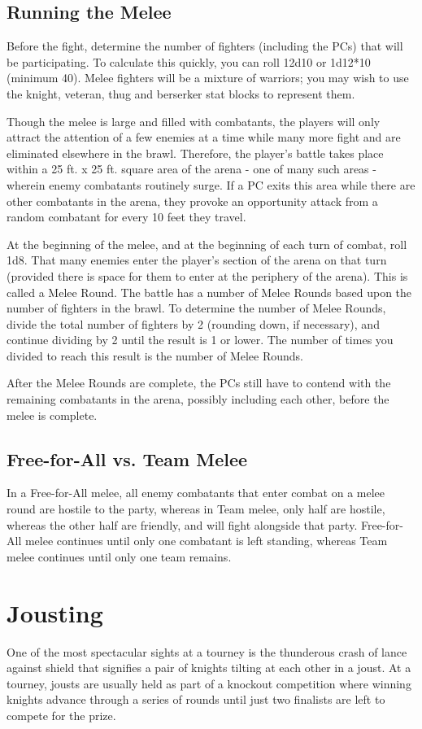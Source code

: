 \documentclass[10pt,a4paper,twoside,bg=print,twocolumn,openany,nodeprecatedcode]{dndbook}
\begin{document}
\subsection{Running the Melee}
Before the fight, determine the number of fighters (including the PCs) that will be participating. To calculate this quickly, you can roll 12d10 or 1d12*10 (minimum 40). Melee fighters will be a mixture of warriors; you may wish to use the knight, veteran, thug and berserker stat blocks to represent them.

Though the melee is large and filled with combatants, the players will only attract the attention of a few enemies at a time while many more fight and are eliminated elsewhere in the brawl. Therefore, the player's battle takes place within a 25 ft. x 25 ft. square area of the arena - one of many such areas - wherein enemy combatants routinely surge. If a PC exits this area while there are other combatants in the arena, they provoke an opportunity attack from a random combatant for every 10 feet they travel.

At the beginning of the melee, and at the beginning of each turn of combat, roll 1d8. That many enemies enter the player's section of the arena on that turn (provided there is space for them to enter at the periphery of the arena). This is called a Melee Round. The battle has a number of Melee Rounds based upon the number of fighters in the brawl. To determine the number of Melee Rounds, divide the total number of fighters by 2 (rounding down, if necessary), and continue dividing by 2 until the result is 1 or lower. The number of times you divided to reach this result is the number of Melee Rounds.

After the Melee Rounds are complete, the PCs still have to contend with the remaining combatants in the arena, possibly including each other, before the melee is complete.

\subsection{Free-for-All vs. Team Melee}
In a Free-for-All melee, all enemy combatants that enter combat on a melee round are hostile to the party, whereas in Team melee, only half are hostile, whereas the other half are friendly, and will fight alongside that party. Free-for-All melee continues until only one combatant is left standing, whereas Team melee continues until only one team remains.

\section{Jousting}
One of the most spectacular sights at a tourney is the thunderous crash of lance against shield that signifies a pair of knights tilting at each other in a joust. At a tourney, jousts are usually held as part of a knockout competition where winning knights advance through a series of rounds until just two finalists are left to compete for the prize.
\end{document}
